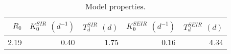 \begin{table}[h]
\centering
\caption{Model properties.}
\label{tab:props}
\begin{tabular}{rrrrr}
\toprule
$R_0$ & $K^{SIR}_0$ $(d^{-1})$ & $T^{SIR}_d$ $(d)$ & $K^{SEIR}_0$ $(d^{-1})$ & $T^{SEIR}_d$ $(d)$ \\
\midrule
 2.19 &                   0.40 &              1.75 &                    0.16 &               4.34 \\
\bottomrule
\end{tabular}
\end{table}
